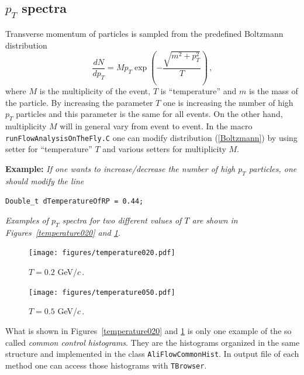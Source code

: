 \documentclass[a4paper]{book}
\numberwithin{equation}{subsection}
\begin{document}
\subsection{$p_T$ spectra}
Transverse momentum of particles is sampled from the predefined Boltzmann distribution 
%
\begin{equation}
\frac{dN}{dp_T} = Mp_T\exp\left(-\frac{\sqrt{m^2+p_T^2}}{T}\right)\,,
\label{Boltzmann}
\end{equation}
%
where $M$ is the multiplicity of the event, $T$ is ``temperature'' and $m$ is the mass of the particle. By increasing the parameter $T$ one is increasing the number of high $p_T$ particles and this parameter is the same for all events. On the other hand, multiplicity $M$ will in general vary from event to event. In the macro \texttt{runFlowAnalysisOnTheFly.C} one can modify distribution (\ref{Boltzmann}) by using setter for ``temperature'' $T$ and various setters for multiplicity $M$. 

\vspace{0.5cm}
\noindent\textbf{Example:} \textit{If one wants to increase/decrease the number of high $p_T$ particles, one should modify the line}
%
\begin{center}
\texttt{Double\_t dTemperatureOfRP = 0.44;}
\end{center}
%
\textit{Examples of $p_T$ spectra for two different values of $T$ are shown in Figures~\ref{temperature020} and \ref{temperature050}}.
\vspace{0.5cm}

\begin{figure}
\begin{minipage}[t]{0.5\linewidth} %
\centering
\texttt{[image: figures/temperature020.pdf]}
\caption{$T=0.2$ GeV/$c$\,.}
\label{temperature020}
\end{minipage}
\hspace{0.5cm} %
\begin{minipage}[t]{0.5\linewidth}
\centering
\texttt{[image: figures/temperature050.pdf]}
\caption{$T=0.5$ GeV/$c$\,.}
\label{temperature050}
\end{minipage}
\end{figure} 

\noindent What is shown in Figures~\ref{temperature020} and \ref{temperature050} is only one example of the so called \textit{common control histograms}. They are the histograms organized in the same structure and implemented in the class \texttt{AliFlowCommonHist}. In output file of each method one can access those histograms with \texttt{TBrowser}.
\end{document}
